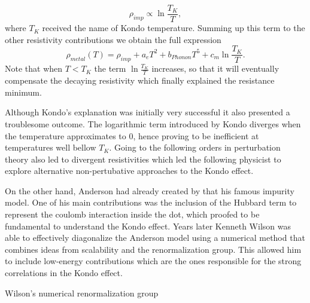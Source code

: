 \begin{equation}
\rho_{imp} \propto \ln{\frac {
T_K }{T}},
\end{equation}
where $T_K$ received the name of Kondo temperature. Summing up this term to the other resistivity contributions we obtain the full expression 
\begin{equation}
{\displaystyle \rho_{metal} (T)=\rho_{imp}+a_{e}T^{2}+b_{Phonon}T^{5} + c_{m}\ln {\frac {
T_K }{T}}}.
\label{logKondo}
\end{equation}
\noindent Note that when $T< T_K$ the term $ \ln {\frac {
T_K }{T}}$ increases, so that it will eventually compensate the decaying resistivity which finally explained the  resistance minimum. 

Although Kondo's explanation was initially very successful it also presented a troublesome outcome. The logarithmic term introduced by Kondo diverges when the temperature approximates to $0$, hence proving to be inefficient at temperatures well bellow $T_K$. Going to the following orders in perturbation theory also led to divergent resistivities which led the following physicist to explore alternative non-pertubative approaches to the Kondo effect. 


On the other hand, Anderson had already created by that his famous impurity model. One of his main contributions was the inclusion of the Hubbard term to represent the coulomb interaction inside the dot, which proofed to be fundamental to understand the Kondo effect. Years later Kenneth Wilson was able to effectively diagonalize the Anderson model using a numerical method that combines ideas from scalability and the renormalization group. This allowed him to include low-energy contributions which are the ones responsible for the strong correlations in the Kondo effect. 

Wilson's numerical renormalization group 






